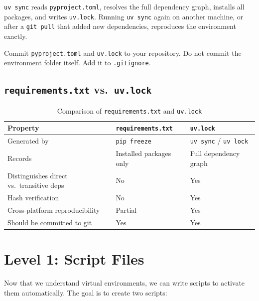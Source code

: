 \texttt{uv sync} reads \texttt{pyproject.toml}, resolves the full
dependency graph, installs all packages, and writes \texttt{uv.lock}.
Running \texttt{uv sync} again on another machine, or after a
\texttt{git pull} that added new dependencies, reproduces the
environment exactly.

\begin{infobox}
Commit \texttt{pyproject.toml} and \texttt{uv.lock} to your
repository. Do not commit the environment folder itself. Add it to
\texttt{.gitignore}.
\end{infobox}

\newpage
\subsection{\texttt{requirements.txt} vs.\ \texttt{uv.lock}}

\begin{table}[h]
\centering
\caption{Comparison of \texttt{requirements.txt} and \texttt{uv.lock}}
\label{tab:req-vs-lock}
\begin{tabular}{@{}p{}p{}p{}@{}}
\toprule
\textbf{Property} & \textbf{\texttt{requirements.txt}} & \textbf{\texttt{uv.lock}} \\
\midrule
Generated by
  & \texttt{pip freeze}
  & \texttt{uv sync} / \texttt{uv lock} \\[4pt]
Records
  & Installed packages only
  & Full dependency graph \\[4pt]
Distinguishes direct vs.\ transitive deps
  & No
  & Yes \\[4pt]
Hash verification
  & No
  & Yes \\[4pt]
Cross-platform reproducibility
  & Partial
  & Yes \\[4pt]
Should be committed to git
  & Yes
  & Yes \\
\bottomrule
\end{tabular}
\end{table}

\section{Level 1: Script Files}
\label{sec:level1}

Now that we understand virtual environments, we can write scripts to
activate them automatically. The goal is to create two scripts:

